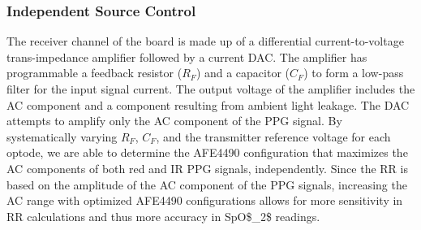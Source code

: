 \subsubsection{Independent Source Control}
The receiver channel of the board is made up of a differential current-to-voltage trans-impedance amplifier followed by a current \ac{DAC}. The amplifier has programmable a feedback resistor ($R_F$) and a capacitor ($C_F$) to form a low-pass filter for the input signal current. The output voltage of the amplifier includes the \ac{AC} component and a component resulting from ambient light leakage. The \ac{DAC} attempts to amplify only the \ac{AC} component of the \ac{PPG} signal. By systematically varying $R_F$, $C_F$, and the transmitter reference voltage for each optode, we are able to determine the \ac{AFE4490} configuration that maximizes the \ac{AC} components of both red and \ac{IR} \ac{PPG} signals, independently. Since the \ac{RR} is based on the amplitude of the \ac{AC} component of the \ac{PPG} signals, increasing the \ac{AC} range with optimized \ac{AFE4490} configurations allows for more sensitivity in \ac{RR} calculations and thus more accuracy in \ac{SpO$_2$} readings. 
        
